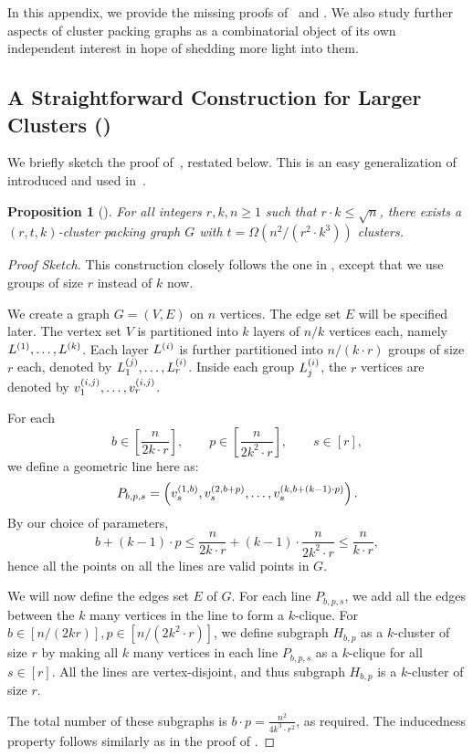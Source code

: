 \documentclass[11pt]{article}
\newtheorem*{proposition*}{Proposition}
\theoremstyle{definition}
\renewcommand{\leq}{\leqslant}
\renewcommand{\geq}{\geqslant}
\newcommand{\paren}[1]{\ensuremath{\left(#1\right)}\xspace}
\begin{document}
In this appendix, we provide the missing proofs of~ and . We also study further aspects of cluster packing graphs as a combinatorial object of its own independent interest in hope of shedding 
more light into them. 

\subsection{A Straightforward Construction for Larger Clusters ()}\label{app:generalized-simple-graph}

We briefly sketch the proof of~, restated below. This is an easy generalization of~ introduced and used in~. 

\begin{proposition*}[]
	For all integers $r,k,n \geq 1$ such that $r \cdot k \leq \sqrt{n}$, there exists a $(r,t,k)$-cluster packing graph $G$ with $t = \Omega(n^2/(r^2 \cdot k^3))$ clusters. 
\end{proposition*}

\begin{proof}[Proof Sketch]
	This construction closely follows the one in , except that we use groups of size $r$ instead of $k$ now. 
	
	We create a graph $G = (V, E)$ on $n$ vertices. The edge set $E$ will be specified later. 
The vertex set $V$ is partitioned into $k$ layers of $n/k$ vertices each, namely $L^{(1)}, \ldots, L^{(k)}$. Each layer $L^{(i)}$ is further partitioned into $n/(k \cdot r)$ groups of size $r$ each, denoted by $L^{(j)}_1, \ldots, L^{(i)}_r$. Inside each group $L^{(i)}_j$, the $r$ vertices are denoted by $v^{(i,j)}_1, \ldots, v^{(i,j)}_r$. 

For each
\[
	b \in [\frac{n}{2k \cdot r}], \qquad p \in [\frac{n}{2k^2 \cdot r}], \qquad s \in [r],
\]
we define a geometric line here as:
\[
	P_{b, p, s} = \paren{\vij{1}{b}_s, \vij{2}{b+p}_s, \ldots, \vij{k}{b+(k-1) \cdot p}_s}. 
\]
By our choice of parameters, 
\[
	b + (k-1) \cdot p \leq \frac{n}{2k \cdot r} + (k-1) \cdot \frac{n}{2k^2 \cdot r} \leq \frac{n}{k \cdot r},
\]
hence all the points on all the lines are valid points in $G$. 

We will now define the edges set $E$ of $G$. For each line $P_{b,p,s}$, we add all the edges between the $k$ many vertices in the line to form a $k$-clique. 
For $b \in [n/(2kr)], p \in [n/(2k^2\cdot r)]$, we define subgraph $H_{b,p}$ as a $k$-cluster of size $r$ by making all $k$ many vertices in each line $P_{b,p,s}$ as a $k$-clique for all $s \in [r]$. 
All the lines are vertex-disjoint, and thus subgraph $H_{b,p}$ is a $k$-cluster of size $r$. 

The total number of these subgraphs is $b \cdot p = \frac{n^2}{4k^3 \cdot r^2}$, as required. The inducedness property follows similarly as in the proof of .
\end{proof}
\end{document}

